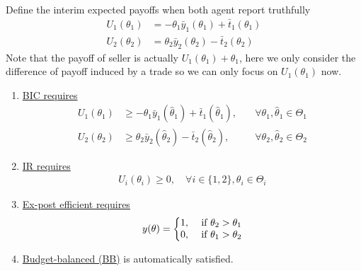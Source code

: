 \documentclass[11pt]{elegantbook_2}
\begin{document}
Define the interim expected payoffs when both agent report truthfully
\begin{equation}
    \begin{aligned}
        U_1(\theta_1)&=-\theta_1\bar{y}_1(\theta_1)+\bar{t}_1(\theta_1)\\
        U_2(\theta_2)&=\theta_2\bar{y}_2(\theta_2)-\bar{t}_2(\theta_2)
    \end{aligned}
    \nonumber
\end{equation}
Note that the payoff of seller is actually $U_1(\theta_1)+\theta_1$, here we only consider the difference of payoff induced by a trade so we can only focus on $U_1(\theta_1)$ now.
\begin{enumerate}
    \item \underline{BIC requires}
    \begin{equation}
        \begin{aligned}
            U_1(\theta_1)&\geq-\theta_1\bar{y}_1(\hat{\theta}_1)+\bar{t}_1(\hat{\theta}_1),\quad &\forall \theta_1,\hat{\theta}_1\in\Theta_1\\
            U_2(\theta_2)&\geq\theta_2\bar{y}_2(\hat{\theta}_2)-\bar{t}_2(\hat{\theta}_2),\quad &\forall \theta_2,\hat{\theta}_2\in\Theta_2
        \end{aligned}
        \nonumber
    \end{equation}
    \item \underline{IR requires}
    \begin{equation}
        \begin{aligned}
            U_i(\theta_i)\geq 0,\quad \forall i\in\{1,2\},\theta_i\in\Theta_i
        \end{aligned}
        \nonumber
    \end{equation}
    \item \underline{Ex-post efficient requires}
    \begin{equation}
        \begin{aligned}
            y(\theta)=\left\{\begin{matrix}
                1,& \textnormal{ if }\theta_2>\theta_1\\
                0,& \textnormal{ if }\theta_1>\theta_2
            \end{matrix}\right.
        \end{aligned}
        \nonumber
    \end{equation}
    \item \underline{Budget-balanced (BB)} is automatically satisfied.
\end{enumerate}
\end{document}
